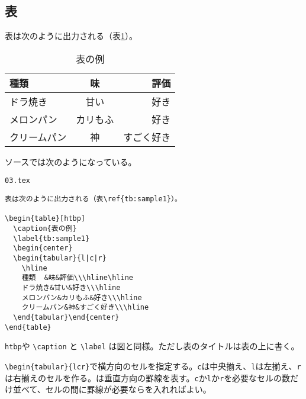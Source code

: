 \subsection{表}

表は次のように出力される（表\ref{tb:sample1}）。

\begin{table}[htbp]
  \caption{表の例}
  \label{tb:sample1}
  \begin{center}
  \begin{tabular}{l|c|r}
    \hline
    種類	&味&評価\\\hline\hline
    ドラ焼き&甘い&好き\\\hline
    メロンパン&カリもふ&好き\\\hline
    クリームパン&神&すごく好き\\\hline
  \end{tabular}\end{center}
\end{table}

ソースでは次のようになっている。

\begin{itembox}[l]{{\tt 03.tex}}
\begin{verbatim}
表は次のように出力される（表\ref{tb:sample1}）。

\begin{table}[htbp]
  \caption{表の例}
  \label{tb:sample1}
  \begin{center}
  \begin{tabular}{l|c|r}
    \hline
    種類	&味&評価\\\hline\hline
    ドラ焼き&甘い&好き\\\hline
    メロンパン&カリもふ&好き\\\hline
    クリームパン&神&すごく好き\\\hline
  \end{tabular}\end{center}
\end{table}
\end{verbatim}
\end{itembox}

{\tt htbp}や \verb|\caption| と \verb|\label| は図と同様。ただし表のタイトルは表の上に書く。

\verb|\begin{tabular}{l|{\tt \textbar}{\tt c}{\tt \textbar}\verb|r}|で横方向のセルを指定する。{\tt c}は中央揃え、{\tt l}は左揃え、{\tt r}は右揃えのセルを作る。{\tt \textbar}は垂直方向の罫線を表す。{\tt c}か{\tt l}か{\tt r}を必要なセルの数だけ並べて、セルの間に罫線が必要なら{\tt \textbar}を入れればよい。

